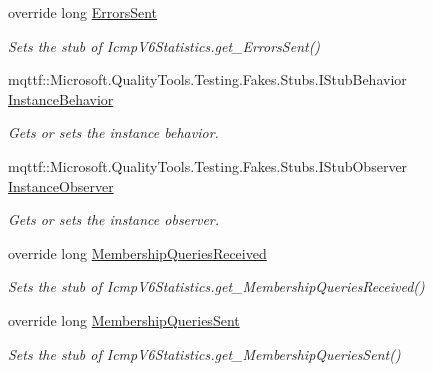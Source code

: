 \begin{DoxyCompactItemize}
override long \hyperlink{class_system_1_1_net_1_1_network_information_1_1_fakes_1_1_stub_icmp_v6_statistics_a66efad36e769c135cf42f0e7488569b3}{Errors\-Sent}
\begin{DoxyCompactList}\small\item\em Sets the stub of Icmp\-V6\-Statistics.\-get\-\_\-\-Errors\-Sent()\end{DoxyCompactList}\item 
mqttf\-::\-Microsoft.\-Quality\-Tools.\-Testing.\-Fakes.\-Stubs.\-I\-Stub\-Behavior \hyperlink{class_system_1_1_net_1_1_network_information_1_1_fakes_1_1_stub_icmp_v6_statistics_a8c592334d265a59e76ce2f19c4d54544}{Instance\-Behavior}
\begin{DoxyCompactList}\small\item\em Gets or sets the instance behavior.\end{DoxyCompactList}\item 
mqttf\-::\-Microsoft.\-Quality\-Tools.\-Testing.\-Fakes.\-Stubs.\-I\-Stub\-Observer \hyperlink{class_system_1_1_net_1_1_network_information_1_1_fakes_1_1_stub_icmp_v6_statistics_a338f773e8d8684b6c40d1b25f9ea619d}{Instance\-Observer}
\begin{DoxyCompactList}\small\item\em Gets or sets the instance observer.\end{DoxyCompactList}\item 
override long \hyperlink{class_system_1_1_net_1_1_network_information_1_1_fakes_1_1_stub_icmp_v6_statistics_a0253b3ab94e152ad96e38399901c4391}{Membership\-Queries\-Received}
\begin{DoxyCompactList}\small\item\em Sets the stub of Icmp\-V6\-Statistics.\-get\-\_\-\-Membership\-Queries\-Received()\end{DoxyCompactList}\item 
override long \hyperlink{class_system_1_1_net_1_1_network_information_1_1_fakes_1_1_stub_icmp_v6_statistics_ab28c2617a26174546f31669f1d60776c}{Membership\-Queries\-Sent}
\begin{DoxyCompactList}\small\item\em Sets the stub of Icmp\-V6\-Statistics.\-get\-\_\-\-Membership\-Queries\-Sent()\end{DoxyCompactList}\item 

\end{DoxyCompactItemize}
